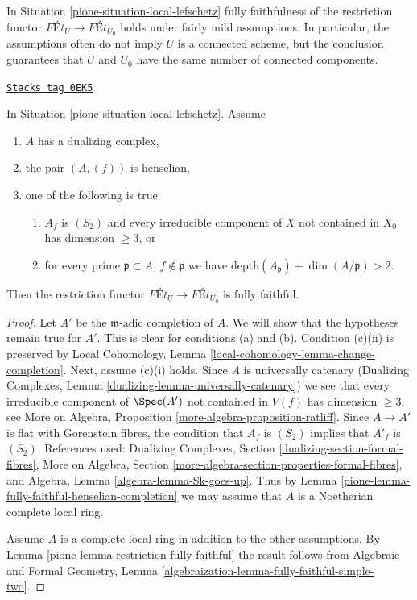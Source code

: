 In Situation \ref{pione-situation-local-lefschetz}
fully faithfulness of the restriction functor
$\textit{F\'Et}_U \longrightarrow \textit{F\'Et}_{U_0}$
holds under fairly mild assumptions.
In particular, the assumptions often do not imply
$U$ is a connected scheme, but the conclusion guarantees
that $U$ and $U_0$ have the same number of connected components.

\begin{lemma}
\label{pione-lemma-fully-faithful-simple}
\href{https://stacks.math.columbia.edu/tag/0EK5}{\texttt{Stacks tag 0EK5}}

In Situation \ref{pione-situation-local-lefschetz}. Assume
\begin{enumerate}
\item[(a)] $A$ has a dualizing complex,
\item[(b)] the pair $(A, (f))$ is henselian,
\item[(c)] one of the following is true
\begin{enumerate}
\item[(i)] $A_f$ is $(S_2)$ and every irreducible component of $X$
not contained in $X_0$ has dimension $\geq 3$, or
\item[(ii)] for every prime
$\mathfrak p \subset A$, $f \not \in \mathfrak p$ we have
$\text{depth}(A_\mathfrak p) + \dim(A/\mathfrak p) > 2$.
\end{enumerate}
\end{enumerate}
Then the restriction functor
$\textit{F\'Et}_U \longrightarrow \textit{F\'Et}_{U_0}$
is fully faithful.
\end{lemma}

\begin{proof}

Let $A'$ be the $\mathfrak m$-adic completion of $A$. We will show that
the hypotheses remain true for $A'$. This is clear for conditions
(a) and (b). Condition (c)(ii) is preserved by
Local Cohomology, Lemma \ref{local-cohomology-lemma-change-completion}.
Next, assume (c)(i) holds. Since $A$ is universally catenary
(Dualizing Complexes, Lemma \ref{dualizing-lemma-universally-catenary})
we see that every irreducible component of $\Spec(A')$ not contained in $V(f)$
has dimension $\geq 3$, see
More on Algebra, Proposition \ref{more-algebra-proposition-ratliff}.
Since $A \to A'$ is flat with Gorenstein fibres,
the condition that $A_f$ is $(S_2)$ implies that $A'_f$ is $(S_2)$.
References used:
Dualizing Complexes, Section \ref{dualizing-section-formal-fibres},
More on Algebra, Section \ref{more-algebra-section-properties-formal-fibres},
and Algebra, Lemma \ref{algebra-lemma-Sk-goes-up}.
Thus by Lemma \ref{pione-lemma-fully-faithful-henselian-completion}
we may assume that $A$ is a Noetherian complete local ring.

\medskip\noindent
Assume $A$ is a complete local ring in addition to the other assumptions.
By Lemma \ref{pione-lemma-restriction-fully-faithful} the result follows from
Algebraic and Formal Geometry, Lemma
\ref{algebraization-lemma-fully-faithful-simple-two}.
\end{proof}

